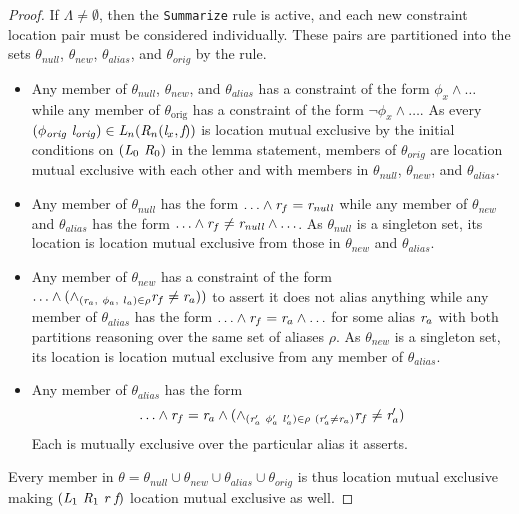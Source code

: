 \begin{proof}
If $\Lambda \neq \emptyset$, then the \texttt{Summarize} rule is
active, and each new constraint location pair must be considered
individually. These pairs are partitioned into the sets
$\theta_\mathit{null}$, $\theta_\mathit{new}$,
$\theta_\mathit{alias}$, and $\theta_\mathit{orig}$ by the rule. 
\begin{itemize}
\item Any member of $\theta_\mathit{null}$, $\theta_\mathit{new}$, and
  $\theta_\mathit{alias}$ has a constraint of the form $\phi_x \wedge
  \ldots$ while any member of $\theta_\mathrm{orig}$ has a constraint
  of the form $\neg \phi_x \wedge \ldots$. As every
  $(\phi_\mathit{orig}\ \cfgnt{l}_\mathit{orig}) \in
  \cfgnt{L}_n(\cfgnt{R}_n(\cfgnt{l}_x,\cfgnt{f}))$ is location mutual exclusive
  by the initial conditions on $(\emph{L}_0\ \emph{R}_0)$ in the lemma statement, members of $\theta_\mathit{orig}$ are location
  mutual exclusive with each other and with members in $\theta_\mathit{null}$,
  $\theta_\mathit{new}$, and $\theta_\mathit{alias}$.
\item Any member of $\theta_\mathit{null}$ has the form $\ldots \wedge
  \emph{r}_f = \emph{r}_\mathit{null}$ while any member of
  $\theta_\mathit{new}$ and $\theta_\mathit{alias}$ has the form
  $\ldots \wedge \emph{r}_f \neq \emph{r}_\mathit{null} \wedge
  \ldots$. As $\theta_\mathit{null}$ is a singleton set, its location is
  location mutual exclusive from those in $\theta_\mathit{new}$ and
  $\theta_\mathit{alias}$.
\item Any member of $\theta_\mathit{new}$ has a constraint of the form
  $\ldots \wedge ( \wedge_{(
  \emph{r}_a,\ \phi_a,\ l_a) \in \rho}
  \emph{r}_f \ne \emph{r}_a) )$ to assert it does not
  alias anything while any member of $\theta_\mathit{alias}$ has
  the form $\ldots \wedge \emph{r}_f = \emph{r}_a \wedge \ldots$ for
  some alias $\emph{r}_a$ with both partitions reasoning over the same set of aliases $\rho$.  As $\theta_\mathit{new}$ is a singleton set, its
  location is location mutual exclusive from any member of
  $\theta_\mathit{alias}$.
\item Any member of $\theta_\mathit{alias}$ has the form
\[\ldots \wedge \cfgnt{r}_f = \cfgnt{r}_a \wedge ( \wedge_{( \cfgnt{r}^{\prime}_a\ \phi^{\prime}_a\ l^{\prime}_a)  \in \rho\ ( \cfgnt{r}^\prime_a \neq \cfgnt{r}_a) } \cfgnt{r}_f \neq \cfgnt{r}^{\prime}_a)\]
Each is mutually exclusive over the particular alias it asserts.
\end{itemize}
Every member in $\theta = \theta_\mathit{null} \cup
\theta_\mathit{new} \cup \theta_\mathit{alias} \cup
\theta_\mathit{orig}$ is thus location mutual exclusive making $(\cfgnt{L}_1\ \cfgnt{R}_1\ \cfgnt{r}\ \cfgnt{f})$ location mutual exclusive as well.


\end{proof}
